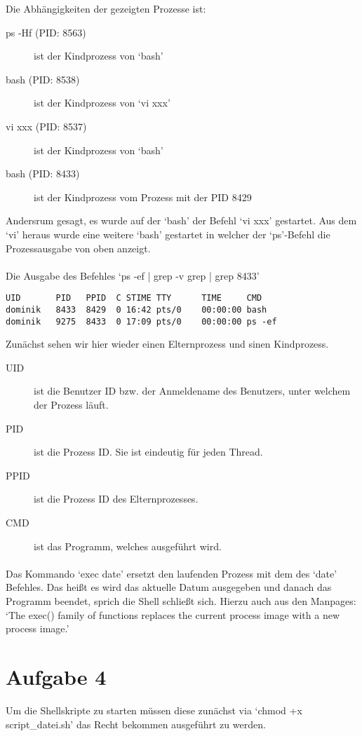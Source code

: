 \documentclass[a4paper]{article}
\begin{document}
Die Abhängigkeiten der gezeigten Prozesse ist:
\begin{description}
\item[ps -Hf (PID: 8563)] ist der Kindprozess von `bash'
\item[bash (PID: 8538)] ist der Kindprozess von `vi xxx'
\item[vi xxx (PID: 8537)] ist der Kindprozess von `bash'
\item[bash (PID: 8433)] ist der Kindprozess vom Prozess mit der PID 8429
\end{description}

Andersrum gesagt, es wurde auf der `bash' der Befehl `vi xxx' gestartet.
Aus dem `vi' heraus wurde eine weitere `bash' gestartet in welcher der `ps'-Befehl
die Prozessausgabe von oben anzeigt.

\paragraph{}
Die Ausgabe des Befehles `ps -ef | grep -v grep | grep 8433'
\begin{verbatim}
UID       PID   PPID  C STIME TTY      TIME     CMD
dominik   8433  8429  0 16:42 pts/0    00:00:00 bash
dominik   9275  8433  0 17:09 pts/0    00:00:00 ps -ef
\end{verbatim}
Zunächst sehen wir hier wieder einen Elternprozess und sinen Kindprozess.	

\begin{description}
\item[UID] ist die Benutzer ID bzw. der Anmeldename des Benutzers, unter welchem der Prozess läuft.
\item[PID] ist die Prozess ID. Sie ist eindeutig für jeden Thread.
\item[PPID] ist die Prozess ID des Elternprozesses.
\item[CMD] ist das Programm, welches ausgeführt wird.
\end{description}

\paragraph{}
Das Kommando `exec date' ersetzt den laufenden Prozess mit dem des `date' Befehles.
Das heißt es wird das aktuelle Datum ausgegeben und danach das Programm beendet, sprich
die Shell schließt sich. Hierzu auch aus den Manpages: 
`The  exec() family of functions replaces the current process image with a new process image.'

\section{Aufgabe 4}
Um die Shellskripte zu starten müssen diese zunächst via `chmod +x script\_datei.sh'
das Recht bekommen ausgeführt zu werden.
\end{document}
